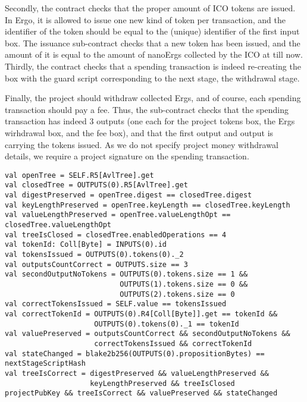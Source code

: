 \documentclass[runningheads]{llncs}
\begin{document}
Secondly, the contract checks that the proper amount of ICO tokens are issued. In Ergo, it is allowed to issue one new kind of token per transaction, and the identifier of the token should be equal to the (unique) identifier of the first input box. The issuance sub-contract checks that a new token has been issued, and the amount of it is equal to the amount of nanoErgs collected by the ICO at till now. Thirdly, the contract checks that a spending transaction is indeed re-creating the box with the guard script corresponding to the next stage, the withdrawal stage.

Finally, the project should withdraw collected Ergs, and of course, each spending transaction should pay a fee. Thus, the sub-contract checks that the spending transaction has indeed 3 outputs (one each for the project tokens box, the Ergs wirhdrawal box, and the fee box), and that the first output and output is carrying the tokens issued. As we do not specify project money withdrawal details, we require a project signature on the spending transaction.
\small{
\begin{verbatim}
val openTree = SELF.R5[AvlTree].get
val closedTree = OUTPUTS(0).R5[AvlTree].get
val digestPreserved = openTree.digest == closedTree.digest
val keyLengthPreserved = openTree.keyLength == closedTree.keyLength
val valueLengthPreserved = openTree.valueLengthOpt == closedTree.valueLengthOpt
val treeIsClosed = closedTree.enabledOperations == 4
val tokenId: Coll[Byte] = INPUTS(0).id
val tokensIssued = OUTPUTS(0).tokens(0)._2
val outputsCountCorrect = OUTPUTS.size == 3
val secondOutputNoTokens = OUTPUTS(0).tokens.size == 1 && 
                           OUTPUTS(1).tokens.size == 0 && 
                           OUTPUTS(2).tokens.size == 0
val correctTokensIssued = SELF.value == tokensIssued
val correctTokenId = OUTPUTS(0).R4[Coll[Byte]].get == tokenId &&
                     OUTPUTS(0).tokens(0)._1 == tokenId
val valuePreserved = outputsCountCorrect && secondOutputNoTokens && 
                     correctTokensIssued && correctTokenId
val stateChanged = blake2b256(OUTPUTS(0).propositionBytes) == nextStageScriptHash
val treeIsCorrect = digestPreserved && valueLengthPreserved && 
                    keyLengthPreserved && treeIsClosed
projectPubKey && treeIsCorrect && valuePreserved && stateChanged
\end{verbatim}
}
\end{document}
